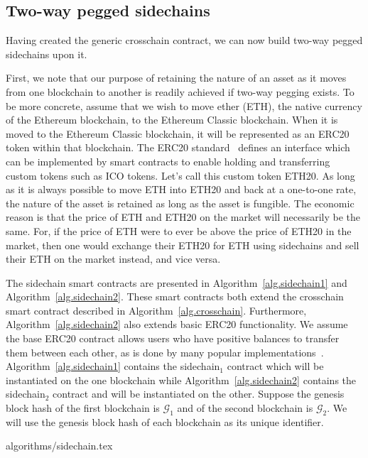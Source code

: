 \subsection*{Two-way pegged sidechains}
Having created the generic crosschain contract, we can now build two-way pegged
sidechains upon it.

First, we note that our purpose of retaining the nature of an asset as it moves
from one blockchain to another is readily achieved if two-way pegging exists. To
be more concrete, assume that we wish to move ether (ETH), the native currency
of the Ethereum blockchain, to the Ethereum Classic blockchain. When it is moved
to the Ethereum Classic blockchain, it will be represented as an ERC20 token
within that blockchain. The ERC20 standard~\cite{erc20} defines an interface
which can be implemented by smart contracts to enable holding and transferring
custom tokens such as ICO tokens. Let's call this custom token ETH20. As long as
it is always possible to move ETH into ETH20 and back at a one-to-one rate, the
nature of the asset is retained as long as the asset is fungible. The economic
reason is that the price of ETH and ETH20 on the market will necessarily be the
same. For, if the price of ETH were to ever be above the price of ETH20 in the
market, then one would exchange their ETH20 for ETH using sidechains and sell
their ETH on the market instead, and vice versa.

The sidechain smart contracts are presented in Algorithm~\ref{alg.sidechain1}
and Algorithm~\ref{alg.sidechain2}. These smart contracts both extend the
\textsf{crosschain} smart contract described in Algorithm~\ref{alg.crosschain}.
Furthermore, Algorithm~\ref{alg.sidechain2} also extends basic ERC20
functionality. We assume the base ERC20 contract allows users who have positive
balances to transfer them between each other, as is done by many popular
implementations~\cite{openzeppelin}. Algorithm~\ref{alg.sidechain1} contains the
\textsf{sidechain}$_1$ contract which will be instantiated on the one blockchain
while Algorithm~\ref{alg.sidechain2} contains the \textsf{sidechain}$_2$
contract and will be instantiated on the other. Suppose the genesis block hash
of the first blockchain is $\mathcal{G}_1$ and of the second blockchain is
$\mathcal{G}_2$. We will use the genesis block hash of each blockchain as its
unique identifier.

{algorithms/sidechain.tex}

